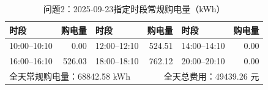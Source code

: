 \begin{table}[H]\centering\small
\caption{问题2：2025-09-23指定时段常规购电量（kWh）}
\label{tab:q2_0923_purchase}
\begin{tabular}{lrlrlr}\toprule
时段 & 购电量 & 时段 & 购电量 & 时段 & 购电量 \\\midrule
10:00--10:10 & 0.00 & 12:00--12:10 & 524.51 & 14:00--14:10 & 0.00 \\
16:00--16:10 & 526.03 & 18:00--18:10 & 762.12 & 20:00--20:10 & 0.00 \\
\midrule
\multicolumn{3}{l}{全天常规购电量：68842.58 kWh} & \multicolumn{3}{r}{全天总费用：49439.26 元}\\
\bottomrule\end{tabular}\end{table}
